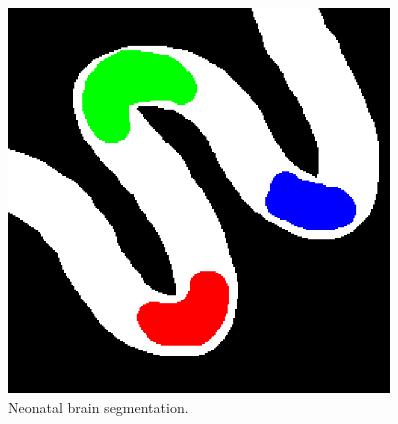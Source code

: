 \documentclass[11pt,english]{article}
\begin{document}
\begin{figure}
\begin{center}
\includegraphics[width=0.9\textwidth]{sparse_labels.png} 
\caption{\baselineskip 12pt \small  Neonatal brain segmentation.  }
\label{fig:neonate}
\end{center}
\end{figure}
\end{document}
